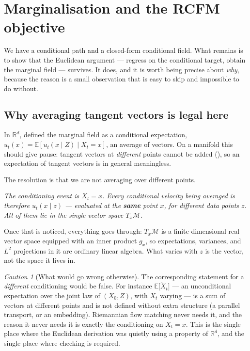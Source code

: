 \documentclass[11pt,a4paper]{report}
\theoremstyle{definition}
\theoremstyle{remark}
\newtheorem{caution}[caution]{Caution}
\newcommand{\RR}{\mathbb R}
\newcommand{\EE}{\mathbb E}
\begin{document}
\section{Marginalisation and the RCFM objective}
\label{sec:rfm-marginalisation}

We have a conditional path and a closed-form conditional field. What remains
is to show that the Euclidean argument --- regress on the conditional target,
obtain the marginal field --- survives. It does, and it is worth being
precise about \emph{why}, because the reason is a small observation that is
easy to skip and impossible to do without.

\subsection{Why averaging tangent vectors is legal here}
\label{sec:rfm-averaging}

In $\RR^d$,  defined the marginal field
as a conditional expectation,
$u_t(x)=\EE[u_t(x\mid Z)\mid X_t=x]$, an average of vectors. On a manifold
this should give pause: tangent vectors at \emph{different} points cannot be
added (), so an expectation of tangent vectors
is in general meaningless.

The resolution is that we are not averaging over different points.

\begin{center}
\emph{The conditioning event is $X_t=x$. Every conditional velocity being
averaged is therefore $u_t(x\mid z)$ --- evaluated at the \textbf{same}
point $x$, for different data points $z$. All of them lie in the single
vector space $T_x\mathcal M$.}
\end{center}

Once that is noticed, everything goes through: $T_x\mathcal M$ is a
finite-dimensional real vector space equipped with an inner product $g_x$,
so expectations, variances, and $L^2$ projections in it are ordinary linear
algebra. What varies with $z$ is the vector, not the space it lives in.

\begin{caution}[What would go wrong otherwise]
\label{caution:rfm-averaging-trap}
The corresponding statement for a \emph{different} conditioning would be
false. For instance
$\EE\bigl[\dot X_t\bigr]$ --- an unconditional expectation over the joint law
of $(X_0,Z)$, with $X_t$ varying --- is a sum of vectors at different points
and is not defined without extra structure (a parallel transport, or an
embedding). Riemannian flow matching never needs it, and the reason it never
needs it is exactly the conditioning on $X_t=x$. This is the single place
where the Euclidean derivation was quietly using a property of $\RR^d$, and
the single place where checking is required.
\end{caution}
\end{document}

